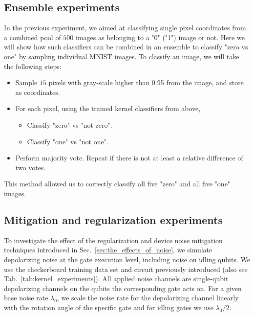 \documentclass[twocolumn,superscriptaddress,nofootinbib]{revtex4-2}
\begin{document}
\subsection{Ensemble experiments} \label{ssec:ensemble_experiments}
    In the previous experiment, we aimed at classifying single pixel coordinates from a combined pool of $500$ images as belonging to a "0" ("1") image or not.
    Here we will show how such classifiers can be combined in an ensemble to classify "zero vs one" by sampling individual MNIST images. %
    To classify an image, we will take the following steps:
    \begin{itemize}
        \item Sample $15$ pixels with gray-scale higher than 0.95 from the image, and store as coordinates.
        \item For each pixel, using the trained kernel classifiers from above,
        \begin{itemize}
            \item Classify "zero" vs "not zero".
            \item Classify "one" vs "not one".
        \end{itemize}
        \item Perform majority vote. Repeat if there is not at least a relative difference of two votes.
    \end{itemize}
    This method allowed us to correctly classify all five "zero" and all five "one" images. 

\subsection{Mitigation and regularization experiments}\label{ssec:numerics_mitigation}

To investigate the effect of the regularization and device noise mitigation techniques introduced in Sec.~\ref{sec:the_effects_of_noise}, we simulate depolarizing noise at the gate execution level, including noise on idling qubits.
We use the checkerboard training data set and circuit previously introduced (also see Tab.~\ref{tab:kernel_experiments}). 
All applied noise channels are single-qubit depolarizing channels on the qubits the corresponding gate acts on.
For a given base noise rate $\lambda_0$, we scale the noise rate for the depolarizing channel linearly with the rotation angle of the specific gate and for idling gates we use $\lambda_0/2$.
\end{document}
